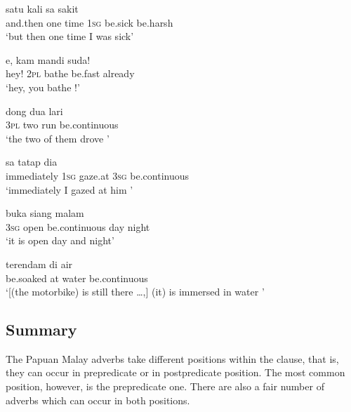 \ea
\label{Example_5.195}
 {satu} {kali} {sa} {sakit} {}\\ %
 and.then  one  time  \textsc{1sg}  be.sick  be.harsh\\
\glt 
‘but then one time I was  sick’ \textstyleExampleSource{[080922-008-CvNP.0009]}
\z

\ea
\label{Example_5.196}
\gll  e,  kam  mandi    suda!\\
 hey!  \textsc{2pl}  bathe  be.fast  already\\
\glt 
‘hey, you bathe !’ \textstyleExampleSource{[080917-008-NP.0128]}
\z

\ea
\label{Example_5.197}
\gll  dong  dua  lari  \\
 \textsc{3pl}  two  run  be.continuous\\
 ‘the two of them drove ’ \textstyleExampleSource{[081015-005-NP.0011]}
\z

\ea
\label{Example_5.198}
 {sa} {tatap} {dia} {}\\ %
 immediately  \textsc{1sg}  gaze.at  \textsc{3sg}  be.continuous\\
\glt 
‘immediately I gazed at him ’ \textstyleExampleSource{[081006-035-CvEx.0071]}
\z

\ea
\label{Example_5.199}
 {buka} {} {siang} {malam}\\ %
 \textsc{3sg}  open  be.continuous  day  night\\
 ‘it is open  day and night’ \textstyleExampleSource{[081005-001-Cv.0003]}
\z

\ea
\label{Example_5.200}
\gll {{\ldots}} {terendam} {di} {air} {}\\ %
 { }  be.soaked  at  water  be.continuous\\
 ‘[(the motorbike) is still there {\ldots},] (it) is immersed in water ’ \textstyleExampleSource{[081008-003-Cv.0026]}
\z


\subsection{Summary}
\label{Para_5.4.9}
The Papuan Malay adverbs take different positions within the clause, that is, they can occur in prepredicate or in postpredicate position. The most common position, however, is the prepredicate one. There are also a fair number of adverbs which can occur in both positions.



